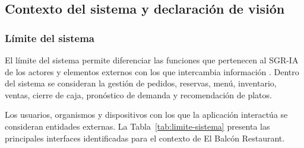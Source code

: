 \subsection{Contexto del sistema y declaración de visión}

\subsubsection{Límite del sistema}

El límite del sistema permite diferenciar las funciones que pertenecen al
SGR-IA de los actores y elementos externos con los que intercambia
información \cite{pohl2025}. Dentro del sistema se consideran la gestión de
pedidos, reservas, menú, inventario, ventas, cierre de caja, pronóstico de
demanda y recomendación de platos.

Los usuarios, organismos y dispositivos con los que la aplicación interactúa
se consideran entidades externas. La Tabla~\ref{tab:limite-sistema} presenta
las principales interfaces identificadas para el contexto de El Balcón
Restaurant.

